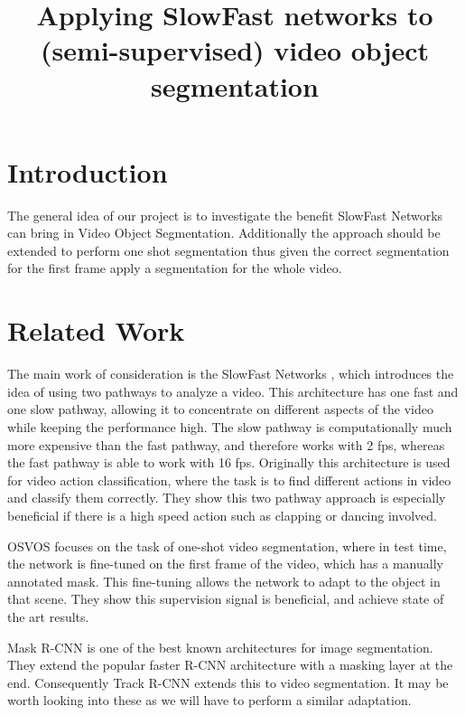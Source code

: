 \documentclass[conference]{IEEEtran}
\begin{document}
\title{Applying SlowFast networks to (semi-supervised) video object segmentation\\
}

\author{
\and
{}
}
\maketitle

\section{Introduction}
The general idea of our project is to investigate the benefit SlowFast Networks \cite{slow_fast} can bring in Video Object Segmentation. Additionally the approach should be extended to perform one shot segmentation thus given the correct segmentation for the first frame apply a segmentation for the whole video. 

\section{Related Work}
The main work of consideration is the SlowFast Networks \cite{slow_fast}, which introduces the idea of using two pathways to analyze a video. This architecture has one fast and one slow pathway, allowing it to concentrate on different aspects of the video while keeping the performance high. The slow pathway is computationally much more expensive than the fast pathway, and therefore works with 2 fps, whereas the fast pathway is able to work with 16 fps. Originally this architecture is used for video action classification, where the task is to find different actions in video and classify them correctly. They show this two pathway approach is especially beneficial if there is a high speed action such as clapping or dancing involved.  

OSVOS \cite{osvos} focuses on the task of one-shot video segmentation, where in test time, the network is fine-tuned on the first frame of the video, which has a manually annotated mask. This fine-tuning allows the network to adapt to the object in that scene. They show this supervision signal is beneficial, and achieve state of the art results.


Mask R-CNN \cite{mask_rcnn} is one of the best known architectures for image segmentation. They extend the popular faster R-CNN architecture with a masking layer at the end. Consequently Track R-CNN \cite{track_rcnn} extends this to video segmentation. It may be worth looking into these as we will have to perform a similar adaptation.
\end{document}
